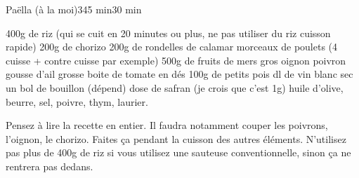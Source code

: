 \begin{recette}{Paëlla (à la moi)}{3}{45 min}{30 min}
\begin{ingredients}
\ingredient 400g de riz (qui se cuit en 20 minutes ou plus, ne pas utiliser du riz cuisson rapide)
\ingredient 200g de chorizo
\ingredient 200g de rondelles de calamar
 morceaux de poulets (4 cuisse + contre cuisse par exemple)
\ingredient 500g de fruits de mers
 gros oignon
 poivron
 gousse d'ail
 grosse boite de tomate en dés
\ingredient 100g de petits pois
 dl de vin blanc sec
\ingredient un bol de bouillon (dépend)
 dose de safran (je crois que c'est 1g)
\ingredient huile d'olive, beurre, sel, poivre, thym, laurier.
\end{ingredients}

\begin{preparation*}
Pensez à lire la recette en entier. Il faudra notamment couper les poivrons, l'oignon, le chorizo. Faites ça pendant la cuisson des autres éléments. N'utilisez pas plus de 400g de riz si vous utilisez une sauteuse conventionnelle, sinon ça ne rentrera pas dedans.


\end{preparation*}
\end{recette}
